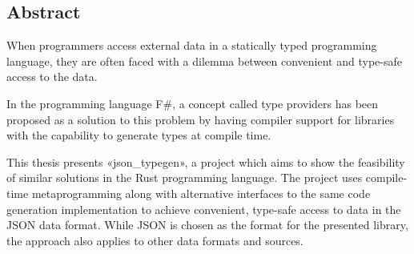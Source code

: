 
\vspace*{2cm}
\thispagestyle{plain}

\begin{center}

\section*{\hfil Abstract \hfil}

\end{center}

When programmers access external data in a statically typed programming language, they are often faced with a dilemma between convenient and type-safe access to the data.

In the programming language F\#, a concept called type providers has been proposed as a solution to this problem by having compiler support for libraries with the capability to generate types at compile time.

This thesis presents «json_typegen», a project which aims to show the feasibility of similar solutions in the Rust programming language. The project uses compile-time metaprogramming along with alternative interfaces to the same code generation implementation to achieve convenient, type-safe access to data in the JSON data format. While JSON is chosen as the format for the presented library, the approach also applies to other data formats and sources.
